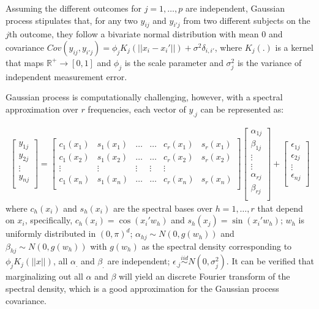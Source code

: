 \documentclass[11pt]{article}
\begin{document}
Assuming the different outcomes for $j=1,\ldots,p$ are independent, Gaussian process stipulates that, for any two $y_{ij}$ and $y_{i'j}$ from two different subjects on the $j$th outcome, they follow a bivariate normal distribution with mean $0$ and covariance $Cov(y_{ij},y_{i'j}) = \phi_j K_j(||x_i - x_i'||) + \sigma^2 \delta_{i,i'}$, where $K_j(.)$ is a kernel that maps $\mathbb{R}^{+}\rightarrow [0,1]$ and $\phi_j$ is the scale parameter and $\sigma_j^2$ is the variance of independent measurement error.

Gaussian process is computationally challenging, however, with a spectral approximation over $r$ frequencies, each vector of $y_{.j}$ can be represented as:

\begin{equation}
\label{spectralView}
\begin{aligned}
\begin{bmatrix}
y_{1j} \\
y_{2j} \\
\vdots \\
y_{nj} \\
\end{bmatrix}
= 
\begin{bmatrix}
c_1(x_{1}) & s_1(x_{1}) & \ldots  & \ldots & c_{r}(x_{1}) & s_{r}(x_{1}) \\
c_1(x_{2}) & s_1(x_{2}) & \ldots  & \ldots & c_{r}(x_{2}) & s_{r}(x_{2}) \\
\vdots &\vdots & \vdots& \vdots & \vdots \\
c_1(x_{n}) & s_1(x_{n}) & \ldots  & \ldots & c_{r}(x_{n}) & s_{r}(x_{n})\\
\end{bmatrix}
\begin{bmatrix}
\alpha_{1j} \\
\beta_{1j} \\ 
 \vdots \\
 \vdots \\
\alpha_{rj} \\
\beta_{rj} \\ 
\end{bmatrix}
+
\begin{bmatrix}
\epsilon_{1j} \\
\epsilon_{2j} \\
\vdots \\
\epsilon_{nj} \\
\end{bmatrix}
\end{aligned}
\end{equation}
where $c_h(x_i)$ and $s_h(x_i)$ are the spectral bases over $h=1,\ldots, r$ that depend on $x_i$, specifically, $c_h(x_i)= \cos(x_i' w_h)$ and $s_h(x_j)=\sin(x_i' w_h)$; $w_h$ is uniformly distributed in $(0,\pi)^{d}$; $\alpha_{hj} \sim N(0, g(w_h))$ and $\beta_{hj} \sim N(0, g(w_h))$ with $g(w_h)$ as the spectral density corresponding to $\phi_j K_j(||x||)$, all $\alpha_{.}$ and $\beta_{.}$ are independent; $\epsilon_{.j}\stackrel{iid}{\sim} N(0,\sigma^2_j)$. It can be verified that marginalizing out all $\alpha$ and $\beta$ will yield an discrete Fourier transform of the spectral density, which is a good approximation for the Gaussian process covariance.
\end{document}
